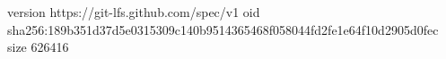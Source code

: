 version https://git-lfs.github.com/spec/v1
oid sha256:189b351d37d5e0315309c140b9514365468f058044fd2fe1e64f10d2905d0fec
size 626416
